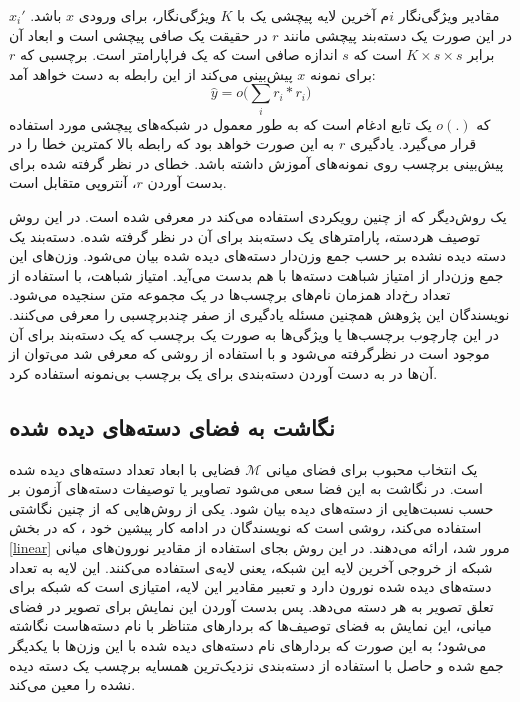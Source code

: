 $x_i'$
 مقادیر ویژگی‌نگار 
  $i$م
  آخرین لایه پیچشی یک    با $K$ ویژگی‌نگار، برای ورودی $x$ باشد. در این صورت یک دسته‌بند پیچشی مانند   $r$ در حقیقت یک صافی پیچشی
است و ابعاد آن برابر 
  $ K \times s \times s$
  است که $s$ اندازه صافی است که یک فراپارامتر است. برچسبی که $r$ برای نمونه $x$ پیش‌بینی می‌کند از این رابطه به دست خواهد آمد:
\begin{equation}
\hat{y} = o \big ( \sum_i r_i \ast r_i \big )
\end{equation}
که $o(.)$ یک تابع ادغام  است که به طور معمول در شبکه‌های پیچشی مورد استفاده قرار می‌گیرد. یادگیری $r$ به این صورت خواهد بود که رابطه بالا کمترین خطا را در پیش‌بینی برچسب روی نمونه‌های آموزش داشته باشد. خطای در نظر گرفته شده برای بدست آوردن $r$، آنتروپی متقابل 
است. 

یک روش‌دیگر که از چنین رویکردی استفاده می‌کند در \cite{ costa} معرفی شده است. در این روش توصیف هردسته، پارامترهای یک  دسته‌بند برای آن در نظر گرفته شده. دسته‌بند یک دسته دیده نشده بر حسب جمع وزن‌دار دسته‌های دیده شده بیان می‌شود. وزن‌های این جمع وزن‌دار از امتیاز شباهت دسته‌ها با هم بدست می‌آید. امتیاز شباهت، با استفاده از تعداد رخ‌داد همزمان نام‌های برچسب‌ها در یک مجموعه متن سنجیده می‌شود. نویسندگان این پژوهش همچنین مسئله یادگیری از صفر چندبرچسبی را معرفی می‌کنند. در این چارچوب برچسب‌ها یا ویژگی‌‌ها به صورت یک برچسب که یک دسته‌بند برای آن موجود است در نظرگرفته می‌شود و با استفاده از روشی که معرفی شد می‌توان از آن‌ها در به دست آوردن دسته‌بندی برای یک برچسب بی‌نمونه استفاده کرد. 


\subsection{نگاشت به فضای دسته‌های دیده شده}\label{toseen}
یک انتخاب محبوب برای فضای میانی $\mathcal{M}$ فضایی با ابعاد تعداد دسته‌های دیده شده است. در نگاشت به این فضا سعی می‌شود تصاویر یا توصیفات دسته‌های آزمون  بر حسب نسبت‌هایی از دسته‌های دیده بیان شود. یکی از روش‌هایی که از چنین نگاشتی استفاده می‌کند، روشی است که نویسندگان \cite{ convex} در ادامه کار پیشین خود  \cite{ devise}، که در بخش \ref{linear} مرور شد، ارائه می‌دهند. در این روش بجای استفاده از مقادیر نورون‌های میانی شبکه  از خروجی آخرین لایه این شبکه، یعنی لایه‌ی  استفاده می‌کنند. این لایه به تعداد دسته‌های دیده شده نورون دارد و تعبیر مقادیر این لایه، امتیازی است که شبکه برای تعلق تصویر به هر دسته ‌می‌دهد. پس بدست آوردن این نمایش برای تصویر در فضای میانی، این نمایش به فضای توصیف‌ها که بردارهای متناظر با نام دسته‌هاست نگاشته می‌شود؛ به این صورت که بردارهای نام دسته‌های دیده شده با این وزن‌ها با یکدیگر جمع شده و حاصل با استفاده از دسته‌بندی نزدیک‌ترین همسایه برچسب یک دسته دیده نشده را معین می‌کند. 

